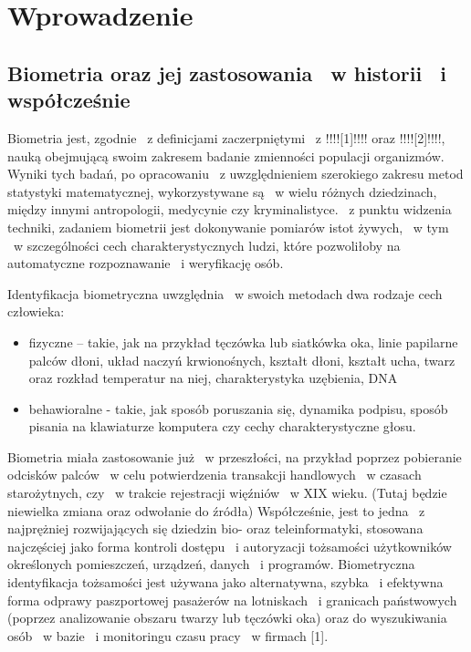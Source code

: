\chapter{Wprowadzenie}
\label{cha:wprowadzenie}


\section{Biometria oraz jej zastosowania ~w historii ~i współcześnie}
\label{sec:biometria}

Biometria jest, zgodnie ~z definicjami zaczerpniętymi ~z !!!![1]!!!! oraz !!!![2]!!!!, nauką obejmującą swoim zakresem badanie zmienności populacji organizmów. Wyniki tych badań, po opracowaniu ~z uwzględnieniem szerokiego zakresu metod statystyki matematycznej, wykorzystywane są ~w wielu różnych dziedzinach, między innymi antropologii, medycynie czy kryminalistyce. ~z punktu widzenia techniki, zadaniem biometrii jest dokonywanie pomiarów istot żywych, ~w tym ~w szczególności cech charakterystycznych ludzi, które pozwoliłoby na automatyczne rozpoznawanie ~i weryfikację osób.

Identyfikacja biometryczna uwzględnia ~w swoich metodach dwa rodzaje cech człowieka:
\begin{itemize} 
\item fizyczne – takie, jak na przykład tęczówka lub siatkówka oka, linie papilarne palców dłoni, układ naczyń krwionośnych, kształt dłoni, kształt ucha, twarz oraz rozkład temperatur na niej, charakterystyka uzębienia, DNA 
\item behawioralne - takie, jak sposób poruszania się, dynamika podpisu, sposób pisania na klawiaturze komputera czy cechy charakterystyczne głosu.
\end{itemize}

Biometria miała zastosowanie już ~w przeszłości, na przykład poprzez pobieranie odcisków palców ~w celu potwierdzenia transakcji handlowych ~w czasach starożytnych, czy ~w trakcie rejestracji więźniów ~w XIX wieku. (Tutaj będzie niewielka zmiana oraz odwołanie do źródła) Współcześnie, jest to jedna ~z najprężniej rozwijających się dziedzin bio- oraz teleinformatyki, stosowana najczęściej jako forma kontroli dostępu ~i autoryzacji tożsamości użytkowników określonych pomieszczeń, urządzeń, danych ~i programów. Biometryczna identyfikacja tożsamości jest używana jako alternatywna, szybka ~i efektywna forma odprawy paszportowej pasażerów na lotniskach ~i granicach państwowych (poprzez analizowanie obszaru twarzy lub tęczówki oka) oraz do wyszukiwania osób ~w bazie ~i monitoringu czasu pracy ~w firmach [1].

